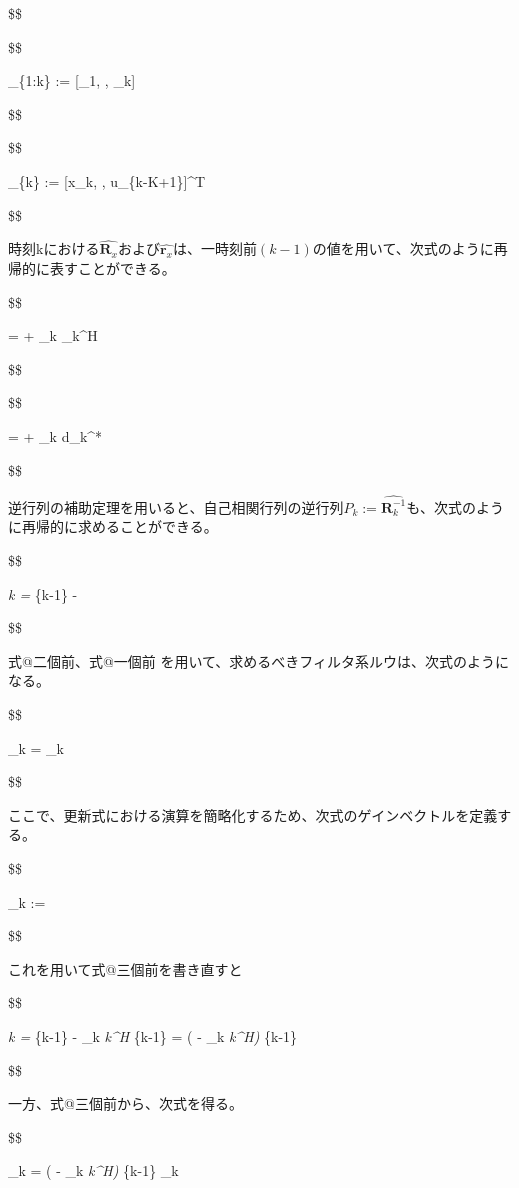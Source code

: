 \$\$

\$\$

\_\{1:k\} := {[}\_1, \cdots, \_k{]}

\$\$

\$\$

\_\{k\} := {[}x\_k, \cdots, u\_\{k-K+1\}{]}\^{}T

\$\$

時刻kにおける\(\hat{\bm{R}_x}\)および\(\hat{\bm{r}_x}\)は、一時刻前\((k-1)\)の値を用いて、次式のように再帰的に表すことができる。

\$\$

 =  + \_k \_k\^{}H

\$\$

\$\$

 =  + \_k d\_k\^{}*

\$\$

逆行列の補助定理を用いると、自己相関行列の逆行列\(P_k := \hat{\bm{R}_k^{-1}}\)も、次式のように再帰的に求めることができる。

\$\$

\emph{k = }\{k-1\} -

\$\$

式@二個前、式@一個前
を用いて、求めるべきフィルタ系ルウは、次式のようになる。

\$\$

\_k = \_k 

\$\$

ここで、更新式における演算を簡略化するため、次式のゲインベクトルを定義する。

\$\$

\_k :=

\$\$

これを用いて式@三個前を書き直すと

\$\$

\emph{k = }\{k-1\} - \_k \emph{k\^{}H
}\{k-1\} = ( - \_k \emph{k\^{}H) }\{k-1\}

\$\$

一方、式@三個前から、次式を得る。

\$\$

\_k = ( - \_k \emph{k\^{}H) }\{k-1\}
\_k

